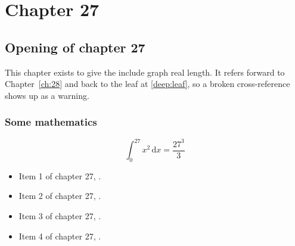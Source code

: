 \chapter{Chapter 27}
\label{ch:27}
\section{Opening of chapter 27}
This chapter exists to give the include graph real length. It refers
forward to Chapter~\ref{ch:28} and back to the leaf
at \ref{deep:leaf}, so a broken cross-reference shows up as a warning.

\subsection{Some mathematics}
\begin{equation}
  \int_0^{27} x^{2} \, \mathrm{d}x = \frac{27^{3}}{3}
\end{equation}

\begin{itemize}
  \item Item 1 of chapter 27, .
  \item Item 2 of chapter 27, .
  \item Item 3 of chapter 27, .
  \item Item 4 of chapter 27, .
\end{itemize}
